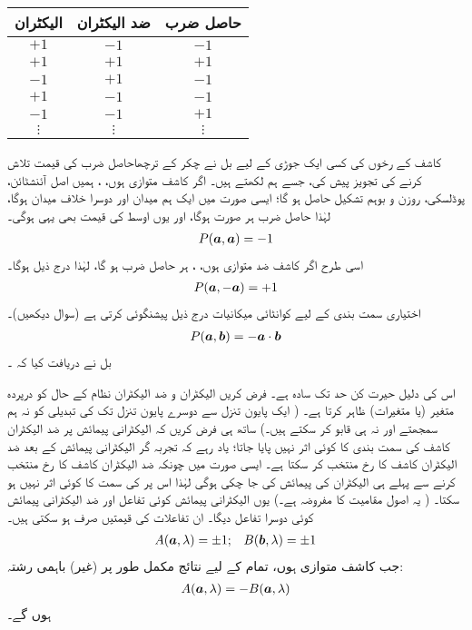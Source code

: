 \begin{center}
\begin{tabular}{c c c}
\toprule
الیکٹران & ضد الیکٹران &حاصل ضرب \\
\midrule
$+1$ & $-1$ & $-1$ \\
$+1$ & $+1$ & $+1$ \\
$-1$ & $+1$ & $-1$ \\
$+1$ & $-1$ & $-1$ \\
$-1$ & $-1$ & $+1$ \\
$\vdots$ & $\vdots$ & $\vdots$ \\
\bottomrule
\end{tabular}
\end{center}

کاشف کے رخوں کی کسی ایک جوڑی کے لیے بل نے چکر کے ترچھا{حاصل ضرب} کی  قیمت تلاش کرنے کی تجویز پیش کی، جسے ہم  لکھتے ہیں۔ اگر کاشف متوازی ہوں، ، ہمیں اصل آئنشٹائن، پوڈلسکی، روزن و بوہم تشکیل حاصل ہو گا؛ ایسی صورت میں ایک ہم میدان اور دوسرا خلاف میدان ہوگا، لہٰذا حاصل ضرب ہر صورت  ہوگا، اور یوں اوسط کی قیمت بھی یہی ہوگی۔
\begin{align}
	P({{\boldsymbol{a}}},{{\boldsymbol{a}}}) = -1
\end{align}
اسی طرح اگر کاشف ضد متوازی ہوں، ، ہر حاصل ضرب  ہو گا، لہٰذا درج ذیل ہوگا۔
\begin{align}
	P({{\boldsymbol{a}}}, -{{\boldsymbol{a}}}) = +1
\end{align}
اختیاری سمت بندی کے لیے کوانٹائی میکانیات درج ذیل پیشنگوئی کرتی ہے (سوال  دیکھیں)۔
\begin{align}\label{مساوات_پس_پیشنگوئی}
	P({{\boldsymbol{a}}}, {{\boldsymbol{b}}}) = -{{\boldsymbol{a}}}\cdot {\ensuremath{{\boldsymbol{b}}}}
\end{align}
 بل نے دریافت کیا کہ ۔

اس کی دلیل حیرت کن حد تک سادہ ہے۔ فرض کریں الیکٹران و ضد الیکٹران نظام کے  حال کو درپردہ متغیر (یا متغیرات)  ظاہر کرتا ہے۔ ( ایک پایون تنزل سے دوسرے پایون تنزل تک  کی تبدیلی کو نہ ہم سمجھتے اور نہ ہی قابو کر سکتے ہیں۔) ساتھ ہی فرض کریں کہ الیکٹرانی پیمائش پر ضد الیکٹران کاشف کی سمت بندی  کا کوئی اثر نہیں پایا جاتا؛ یاد رہے کہ تجربہ گر الیکٹرانی پیمائش کے بعد ضد الیکٹران کاشف کا رخ منتخب کر سکتا ہے۔ ایسی صورت میں چونکہ ضد الیکٹران کاشف کا رخ منتخب کرنے سے پہلے ہی الیکٹران کی پیمائش کی جا چکی ہوگی لہٰذا اس پر  کی سمت کا کوئی اثر نہیں ہو سکتا۔ ( یہ اصول مقامیت کا مفروضہ ہے۔) یوں الیکٹرانی پیمائش کوئی تفاعل  اور ضد الیکٹرانی پیمائش کوئی دوسرا تفاعل  دیگا۔ ان تفاعلات کی قیمتیں صرف  ہو سکتی ہیں۔
\begin{align}\label{مساوات_پس_دو_رشتے}
	A({{\boldsymbol{a}}}, \lambda) = \pm1; && B({{\boldsymbol{b}}}, \lambda) = \pm 1
\end{align}
جب کاشف متوازی ہوں، تمام  کے لیے نتائج مکمل طور پر (غیر) باہمی رشتہ:
\begin{align}\label{مساوات_پس_غیر_باہمی_رشتہ}
	A({{\boldsymbol{a}}}, \lambda) = -B({{\boldsymbol{a}}}, \lambda)
\end{align}
ہوں گے۔

